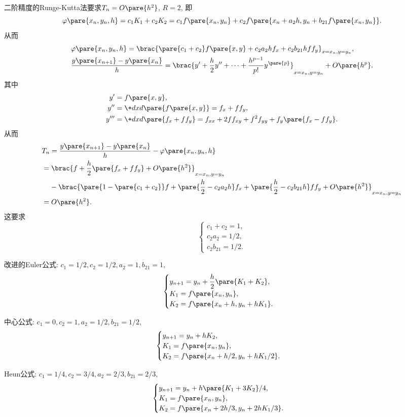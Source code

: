 \documentclass[hidelinks]{ctexart}
\begin{document}
二阶精度的Runge-Kutta法要求$T_n = O\pare{h^2}$, $R=2$, 即
\[ \varphi\pare{x_n,y_n,h} = c_1K_1 + c_2K_2 = c_1 f\pare{x_n,y_n} + c_2 f\pare{x_n + a_2h, y_n + b_{21}f\pare{x_n,y_n}}. \]
从而
\begin{align*}
    & \varphi\pare{x_n,y_n,h} = \brac{\pare{c_1+c_2}f\pare{x,y} + c_2a_2 h f_x + c_2b_{21}hff_y}_{x=x_n,y=y_n}, \\
    & \frac{y\pare{x_{n+1}} - y\pare{x_n}}{h} = \brac{y' + \frac{h}{2}y'' + \cdots + \frac{h^{p-1}}{p!}y^{\pare{p}}}_{x=x_n,y=y_n} + O\pare{h^p}.
\end{align*}
其中
\begin{align*}
    y' &= f\pare{x,y}, \\
    y'' &= \+dxd{}\pare{f\pare{x,y}} = f_x + ff_y, \\
    y''' &= \+dxd{}\pare{f_x+ff_y} = f_{xx} + 2ff_{xy} + f^2 f_{yy} + f_y\pare{f_x - ff_y}.
\end{align*}
从而
\begin{align*}
    & T_n = \frac{y\pare{x_{n+1}} - y\pare{x_n}}{h} - \varphi\pare{x_n,y_n,h} \\
    &= \brac{f + \frac{h}{2}\pare{f_x + ff_y} + O\pare{h^2}}_{x=x_n,y=y_n} \\
    &\phantom{=\ } - \brac{\pare{1-\pare{c_1+c_2}}f + \pare{\frac{h}{2} - c_2a_2h}f_x + \pare{\frac{h}{2} - c_2b_{21}h}ff_y + O\pare{h^2}}_{x=x_n,y=y_n}\\
    &= O\pare{h^2}.
\end{align*}
这要求
\[ \begin{cases}
    c_1 + c_2 = 1, \\
    c_2 a_2 = 1/2, \\
    c_2b_{21} = 1/2.
\end{cases} \]
\begin{cenum}
    \item 改进的Euler公式: $c_1 = 1/2, c_2=1/2, a_2 = 1, b_{21} = 1$,
    \[ \begin{cases}
        \displaystyle y_{n+1} = y_n + \frac{h}{2}\pare{K_1 + K_2}, \\
        \displaystyle K_1 = f\pare{x_n,y_n}, \\
        \displaystyle K_2 = f\pare{x_n+h,y_n + hK_1}.
    \end{cases} \]
    \item 中心公式: $c_1 = 0, c_2 = 1, a_2 = 1/2, b_{21} = 1/2$,
    \[ \begin{cases}
        \displaystyle y_{n+1} = y_n + hK_2, \\
        K_1 = f\pare{x_n,y_n}, \\
        K_2 = f\pare{x_n + h/2, y_n + hK_1/2}.
    \end{cases} \]
    \item Heun公式: $c_1 = 1/4, c_2 = 3/4, a_2 = 2/3, b_{21} = 2/3$,
    \[ \begin{cases}
        \displaystyle y_{n+1} = y_n + h\pare{K_1+3K_2}/4, \\
        K_1 = f\pare{x_n,y_n}, \\
        K_2 = f\pare{x_n + 2h/3, y_n + 2hK_1/3}.
    \end{cases} \]
\end{cenum}
\end{document}
